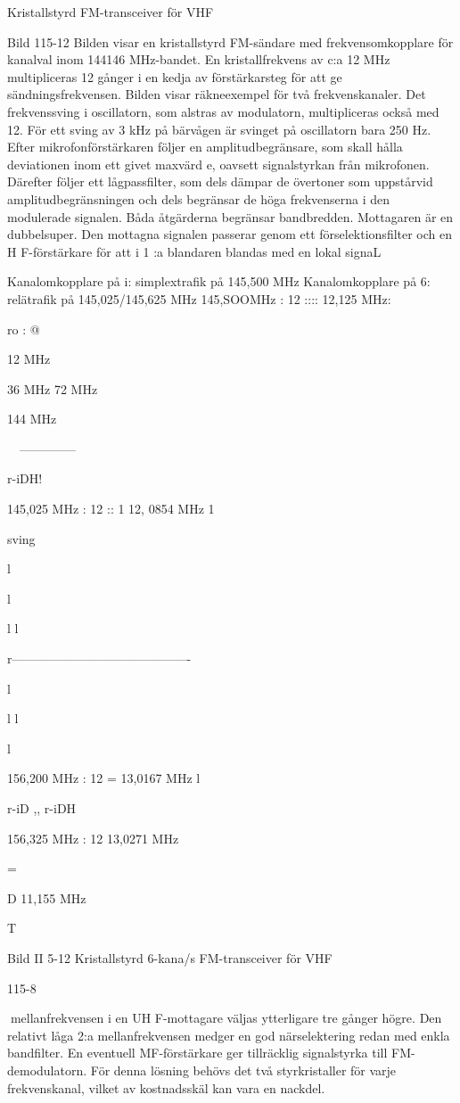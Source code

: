 \documentclass[a4paper,twoside,twocolumn,openright]{book}
\begin{document}
{{{Kristallstyrd FM-transceiver för VHF

Bild 115-12
Bilden visar en kristallstyrd FM-sändare med
frekvensomkopplare för kanalval inom 144146 MHz-bandet.
En kristallfrekvens av c:a 12 MHz multipliceras 12 gånger i en kedja av förstärkarsteg
för att ge sändningsfrekvensen. Bilden visar
räkneexempel för två frekvenskanaler. Det
frekvenssving i oscillatorn, som alstras av
modulatorn, multipliceras också med 12.
För ett sving av 3 kHz på bärvågen är
svinget på oscillatorn bara 250 Hz.
Efter mikrofonförstärkaren följer en amplitudbegränsare, som skall hålla deviationen inom ett givet maxvärd e, oavsett signalstyrkan från mikrofonen. Därefter följer ett
lågpassfilter, som dels dämpar de övertoner
som uppstårvid amplitudbegränsningen och
dels begränsar de höga frekvenserna i den
modulerade signalen. Båda åtgärderna begränsar bandbredden.
Mottagaren är en dubbelsuper. Den mottagna signalen passerar genom ett förselektionsfilter och en H F-förstärkare för att
i 1 :a blandaren blandas med en lokal signaL

Kanalomkopplare på i: simplextrafik på 145,500 MHz
Kanalomkopplare på 6: relätrafik på 145,025/145,625 MHz
145,SOOMHz : 12 ::::
12,125 MHz:

ro :
@

12 MHz

36 MHz 72 MHz

144 MHz

~~--------------~

r-iDH!

145,025 MHz : 12 :: 1
12, 0854 MHz
1

sving

l

l

l
l

r-------------------------------------------~

l

l
l

l

156,200 MHz : 12 =
13,0167 MHz
l

r-iD ,,
r-iDH

156,325 MHz : 12
13,0271 MHz

=

D 11,155 MHz

T

Bild II 5-12 Kristallstyrd 6-kana/s FM-transceiver för VHF

115-8

mellanfrekvensen i en UH F-mottagare väljas ytterligare tre gånger högre. Den relativt
låga 2:a mellanfrekvensen medger en god
närselektering redan med enkla bandfilter.
En eventuell MF-förstärkare ger tillräcklig
signalstyrka till FM-demodulatorn.
För denna lösning behövs det två styrkristaller för varje frekvenskanal, vilket av
kostnadsskäl kan vara en nackdel.

}}}
\end{document}
